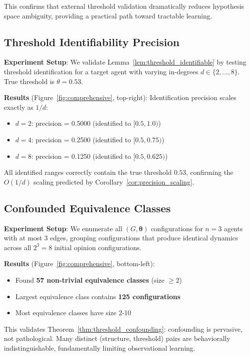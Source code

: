 \documentclass[11pt]{article}
\begin{document}
This confirms that external threshold validation dramatically reduces hypothesis space ambiguity, providing a practical path toward tractable learning.

\subsection{Threshold Identifiability Precision}

\textbf{Experiment Setup}: We validate Lemma~\ref{lem:threshold_identifiable} by testing threshold identification for a target agent with varying in-degrees $d \in \{2, \ldots, 8\}$. True threshold is $\theta = 0.53$.

\textbf{Results} (Figure~\ref{fig:comprehensive}, top-right): Identification precision scales exactly as $1/d$:
\begin{itemize}
\item $d=2$: precision = 0.5000 (identified to $[0.5, 1.0)$)
\item $d=4$: precision = 0.2500 (identified to $[0.5, 0.75)$)
\item $d=8$: precision = 0.1250 (identified to $[0.5, 0.625)$)
\end{itemize}

All identified ranges correctly contain the true threshold $0.53$, confirming the $O(1/d)$ scaling predicted by Corollary~\ref{cor:precision_scaling}.

\subsection{Confounded Equivalence Classes}

\textbf{Experiment Setup}: We enumerate all $(G, \boldsymbol{\theta})$ configurations for $n=3$ agents with at most 3 edges, grouping configurations that produce identical dynamics across all $2^3 = 8$ initial opinion configurations.

\textbf{Results} (Figure~\ref{fig:comprehensive}, bottom-left):
\begin{itemize}
\item Found \textbf{57 non-trivial equivalence classes} (size $\geq 2$)
\item Largest equivalence class contains \textbf{125 configurations}
\item Most equivalence classes have size 2-10
\end{itemize}

This validates Theorem~\ref{thm:threshold_confounding}: confounding is pervasive, not pathological. Many distinct (structure, threshold) pairs are behaviorally indistinguishable, fundamentally limiting observational learning.
\end{document}

